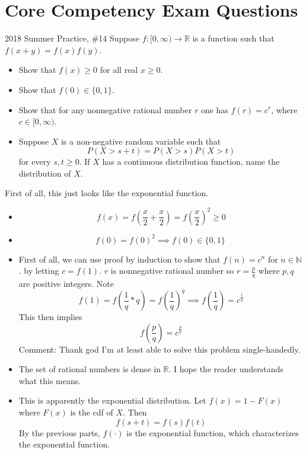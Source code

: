 \documentclass[../main]{subfiles}
\begin{document}
\section{Core Competency Exam Questions}
\begin{bbox}{{2018 Summer Practice, \#14}}
    Suppose $f: [0,\infty) \to \mathbb R$ is a function such that $f(x+y) = f(x)f(y)$.
    \begin{itemize}
        \item Show that $f(x)\geq 0$ for all real $x \geq 0$.
        \item Show that $f(0) \in \{0,1\}$.
        \item Show that for any nonnegative rational number $r$ one has $f(r)=c^r$, where $c\in[0,\infty)$.
        \item Suppose $X$ is a non-negative random variable such that 
        \[
        P(X > s+t) = P(X>s) P(X>t)
        \] for every $s,t \geq 0$. If $X$ has a continuous distribution function, name the distribution of $X$.
    \end{itemize}
\end{bbox}
\begin{solution}
    First of all, this just looks like the exponential function.
    \begin{itemize}
        \item \[
        f(x) = f(\frac{x}{2} + \frac{x}{2}) = f(\frac{x}{2})^2 \geq 0
        \]
        \item \[
        f(0) = f(0)^2 \implies f(0) \in \{0,1\}
        \
        \]
        \item First of all, we can use proof by induction to show that $f(n) = c^n$ for $n\in \mathbb N$. by letting $c = f(1)$.
        \newline
        $r$ is nonnegative rational number so $r=\frac{p}{q}$ where $p,q$ are positive integers. Note \[
        f(1) = f\left(\frac{1}{q} * q\right) =f\left(\frac{1}{q}\right)^q \implies f\left(\frac{1}{q}\right) = c^{\frac{1}{q}} 
        \]
        This then implies \[
        f\left(\frac{p}{q}\right) = c^{\frac{p}{q}}
        \]
        Comment: Thank god I'm at least able to solve this problem single-handedly.
        \item The set of rational numbers is dense in $\mathbb R$. I hope the reader understands what this means.
        \item This is apparently the exponential distribution.
        \newline
        Let $f(x) = 1 - F(x)$ where $F(x)$ is the cdf of $X$. Then 
        \[
        f(s+t) = f(s)f(t)
        \]
        By the previous parts, $f(\cdot)$ is the exponential function, which characterizes the exponential function.
    \end{itemize}
\end{solution}
\end{document}
